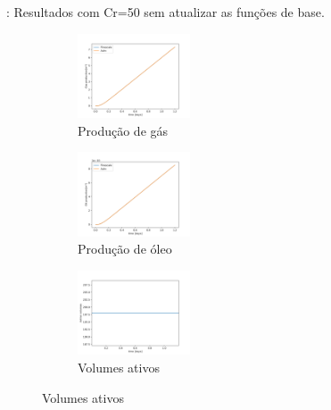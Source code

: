\documentclass[professionalfont]{beamer}
\begin{document}
\begin{frame}{\FrameProblemName: {\small Resultados com Cr=50 sem atualizar as funções de base.}}
    \begin{figure}[!ht]
        \centering
        \begin{subfigure}{.48\textwidth}
            \centering
            \includegraphics[height=2.5cm]{./imgs/pr2/3k_5000x1x1/cr 50/v2/no_update/svgtopng/figura_case-finescale_3k_5000_CR50_no_updateGas_production.png}
            \caption{Produção de gás}
        \end{subfigure}
        \hfill
        \begin{subfigure}{.48\textwidth}
            \centering
            \includegraphics[height=2.5cm]{./imgs/pr2/3k_5000x1x1/cr 50/v2/no_update/svgtopng/figura_case-finescale_3k_5000_CR50_no_updateOil_production.png}
            \caption{Produção de óleo}
        \end{subfigure}
        \bigskip
        \begin{subfigure}{\textwidth}
            \centering
            \includegraphics[height=2.5cm]{./imgs/pr2/3k_5000x1x1/cr 50/v2/no_update/svgtopng/figura_case-finescale_3k_5000_CR50_no_updateActive_volumes.png}
            \caption{Volumes ativos}
        \end{subfigure}
        \label{fig:fig4_pr2-cr50}
        
    \end{figure}
    
\end{frame}
\end{document}

